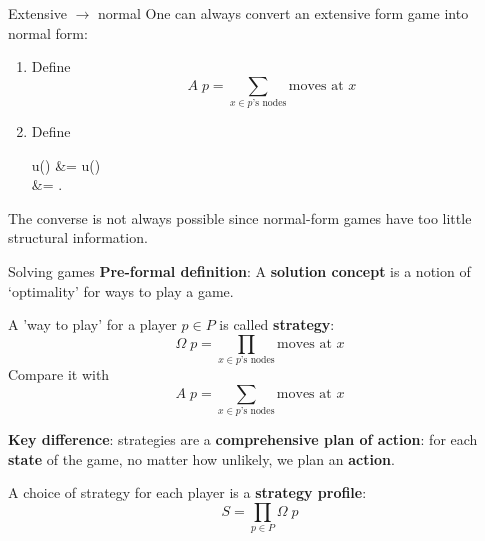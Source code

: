 \begin{frame}{Extensive $\to$ normal}
	One can always convert an extensive form game into normal form:

	\hfill
	\begin{enumerate}
		\item Define
		\begin{equation*}
			A\; p = \sum_{x \in \text{$p$'s nodes}} \text{moves at $x$}
		\end{equation*}
		\item Define
		\begin{eqalign*}
			u() &=
			u()\\
			&= .
		\end{eqalign*}
	\end{enumerate}

	\vfill
	The converse is not always possible since normal-form games have too little structural information.
\end{frame}

\begin{frame}{Solving games}
	\textbf{Pre-formal definition}: A \textbf{solution concept} is a notion of `optimality' for ways to play a game.

	A 'way to play' for a player $p \in P$ is called \textbf{strategy}:
	\begin{equation*}
		\Omega\; p = \prod_{x \in \text{$p$'s nodes}} \text{moves at $x$}
	\end{equation*}
	Compare it with
	\begin{equation*}
		A\; p = \sum_{x \in \text{$p$'s nodes}} \text{moves at $x$}
	\end{equation*}

	\textbf{Key difference}: strategies are a \textbf{comprehensive plan of action}: for each \textbf{state} of the game, no matter how unlikely, we plan an \textbf{action}.

	A choice of strategy for each player is a \textbf{strategy profile}:
	\begin{equation*}
		S = \prod_{p \in P} \Omega\; p
	\end{equation*}
\end{frame}

